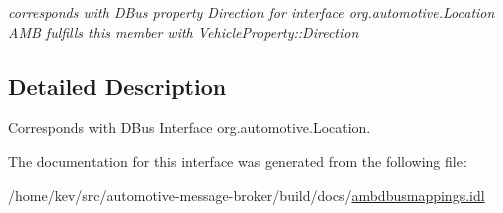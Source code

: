 \begin{DoxyCompactItemize}
\begin{DoxyCompactList}\small\item\em corresponds with D\+Bus property Direction for interface org.\+automotive.\+Location A\+M\+B fulfills this member with Vehicle\+Property\+::\+Direction \end{DoxyCompactList}\end{DoxyCompactItemize}


\subsection{Detailed Description}
Corresponds with D\+Bus Interface org.\+automotive.\+Location. 

The documentation for this interface was generated from the following file\+:\begin{DoxyCompactItemize}
\item 
/home/kev/src/automotive-\/message-\/broker/build/docs/\hyperlink{ambdbusmappings_8idl}{ambdbusmappings.\+idl}\end{DoxyCompactItemize}
